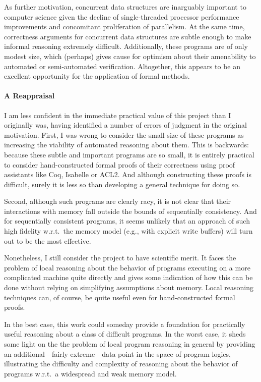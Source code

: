 \documentclass[11pt]{report}
\begin{document}
As further motivation, concurrent data structures are inarguably important to computer science given the decline of single-threaded processor performance improvements and concomitant proliferation of parallelism. At the same time, correctness arguments for concurrent data structures are subtle enough to make informal reasoning extremely difficult. Additionally, these programs are of only modest size, which (perhaps) gives cause for optimism about their amenability to automated or semi-automated verification. Altogether, this appears to be an excellent opportunity for the application of formal methods. 

\paragraph{A Reappraisal}

I am less confident in the immediate practical value of this project than I originally was, having identified a number of errors of judgment in the original motivation. First, I was wrong to consider the small size of these programs as increasing the viability of automated reasoning about them. This is backwards: because these subtle and important programs are so small, it is entirely practical to consider hand-constructed formal proofs of their correctness using proof assistants like Coq, Isabelle or ACL2. And although constructing these proofs is difficult, surely it is less so than developing a general technique for doing so. 

Second, although such programs are clearly racy, it is not clear that their interactions with memory fall outside the bounds of sequentially consistency. And for sequentially consistent programs, it seems unlikely that an approach of such high fidelity w.r.t.~the memory model (e.g., with explicit write buffers) will turn out to be the most effective. 

Nonetheless, I still consider the project to have scientific merit. It faces the problem of local reasoning about the behavior of programs executing on a more complicated machine quite directly and gives some indication of how this can be done without relying on simplifying assumptions about memory. Local reasoning techniques can, of course, be quite useful even for hand-constructed formal proofs. 

In the best case, this work could someday provide a foundation for practically useful reasoning about a class of difficult programs. In the worst case, it sheds some light on the the problem of local program reasoning in general by providing an additional---fairly extreme---data point in the space of program logics, illustrating the difficulty and complexity of reasoning about the behavior of programs w.r.t.~a widespread and weak memory model. 
\end{document}
